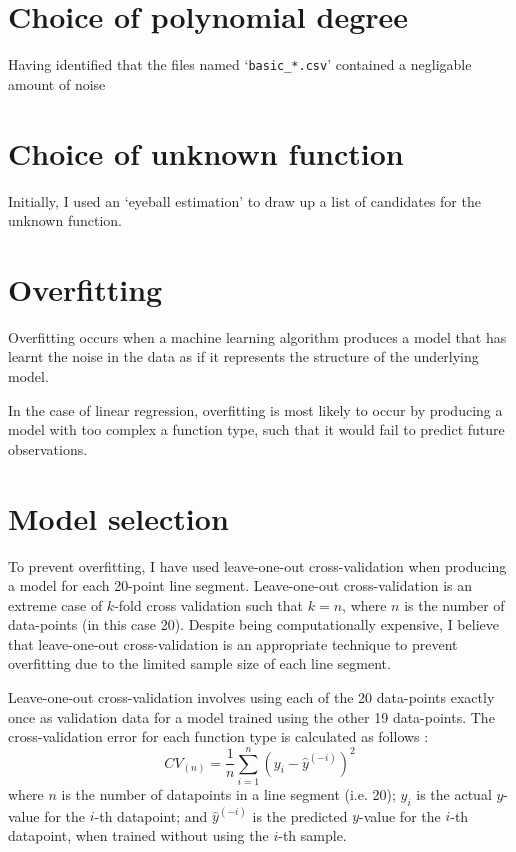\documentclass[onecolumn, 12pt, a4paper]{article}
\begin{document}
\section{Choice of polynomial degree}

Having identified that the files named `\texttt{basic\_*.csv}'
contained a negligable amount of noise


\section{Choice of unknown function}

Initially, I used an `eyeball estimation' to draw up a list
of candidates for the unknown function.

\section{Overfitting}

Overfitting occurs when a machine learning algorithm
produces a model that has learnt the noise in the data
as if it represents the structure of the underlying
model. \cite{MSMI}

In the case of linear regression, overfitting is most
likely to occur by producing a model with too complex a function
type, such that it would fail to predict future observations.

\section{Model selection}

To prevent overfitting, I have used leave-one-out
cross-validation when producing a model for each 20-point
line segment. Leave-one-out cross-validation is 
an extreme case of $k$-fold cross validation
such that $k = n$, where
$n$ is the number of data-points (in this case 20).
Despite being computationally expensive, I believe that
leave-one-out cross-validation is an appropriate technique
to prevent overfitting due to the limited sample size
of each line segment.

Leave-one-out cross-validation involves using each of
the 20 data-points exactly once as validation data for a model
trained using the other 19 data-points. 
The cross-validation error for each function type is calculated
as follows \cite{Stanford}:
\[
    CV_{(n)} = \frac{1}{n} \sum_{i = 1}^{n} (y_{i} - \hat{y}^{(-i)})^{2}
\]
where
$n$ is the number of datapoints in a line segment (i.e. 20);
$y_{i}$ is the actual $y$-value for the $i$-th datapoint;
and $\hat{y}^{(-i)}$ is the predicted $y$-value for the $i$-th
datapoint, when trained without using the $i$-th sample.
\end{document}
